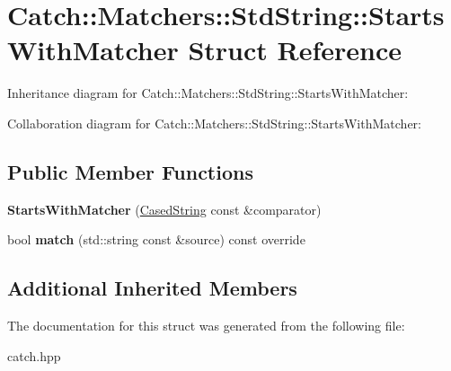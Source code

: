 \hypertarget{structCatch_1_1Matchers_1_1StdString_1_1StartsWithMatcher}{}\section{Catch\+:\+:Matchers\+:\+:Std\+String\+:\+:Starts\+With\+Matcher Struct Reference}
\label{structCatch_1_1Matchers_1_1StdString_1_1StartsWithMatcher}


Inheritance diagram for Catch\+:\+:Matchers\+:\+:Std\+String\+:\+:Starts\+With\+Matcher\+:


Collaboration diagram for Catch\+:\+:Matchers\+:\+:Std\+String\+:\+:Starts\+With\+Matcher\+:
\subsection*{Public Member Functions}
\begin{DoxyCompactItemize}
\item 
\mbox{\label{structCatch_1_1Matchers_1_1StdString_1_1StartsWithMatcher_a7b86f258bdbd131a6e7bcd94a8977325}} 
{\bfseries Starts\+With\+Matcher} (\hyperlink{structCatch_1_1Matchers_1_1StdString_1_1CasedString}{Cased\+String} const \&comparator)
\item 
\mbox{\label{structCatch_1_1Matchers_1_1StdString_1_1StartsWithMatcher_a7da4747aed0c48989d8be59a89e2b7fb}} 
bool {\bfseries match} (std\+::string const \&source) const override
\end{DoxyCompactItemize}
\subsection*{Additional Inherited Members}


The documentation for this struct was generated from the following file\+:\begin{DoxyCompactItemize}
\item 
catch.\+hpp\end{DoxyCompactItemize}
